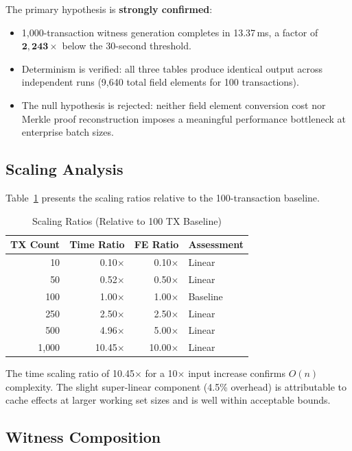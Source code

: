 \documentclass[conference]{IEEEtran}
\begin{document}
The primary hypothesis is \textbf{strongly confirmed}:

\begin{itemize}
\item 1{,}000-transaction witness generation completes in 13.37\,ms,
      a factor of $\mathbf{2{,}243\times}$ below the 30-second threshold.
\item Determinism is verified: all three tables produce identical
      output across independent runs (9{,}640 total field elements
      for 100 transactions).
\item The null hypothesis is rejected: neither field element
      conversion cost nor Merkle proof reconstruction imposes a
      meaningful performance bottleneck at enterprise batch sizes.
\end{itemize}

\subsection{Scaling Analysis}

Table~\ref{tab:scaling} presents the scaling ratios relative to the
100-transaction baseline.

\begin{table}[htbp]
\caption{Scaling Ratios (Relative to 100 TX Baseline)}
\label{tab:scaling}
\centering
\begin{tabular}{rrrl}
\toprule
\textbf{TX Count} & \textbf{Time Ratio} & \textbf{FE Ratio} & \textbf{Assessment} \\
\midrule
10    & 0.10$\times$  & 0.10$\times$ & Linear \\
50    & 0.52$\times$  & 0.50$\times$ & Linear \\
100   & 1.00$\times$  & 1.00$\times$ & Baseline \\
250   & 2.50$\times$  & 2.50$\times$ & Linear \\
500   & 4.96$\times$  & 5.00$\times$ & Linear \\
1{,}000 & 10.45$\times$ & 10.00$\times$ & Linear \\
\bottomrule
\end{tabular}
\end{table}

The time scaling ratio of 10.45$\times$ for a 10$\times$ input increase
confirms $O(n)$ complexity. The slight super-linear component (4.5\%
overhead) is attributable to cache effects at larger working set sizes
and is well within acceptable bounds.

\subsection{Witness Composition}
\end{document}
